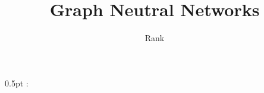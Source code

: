 \documentclass[11pt]{article}
\title{Graph Neutral Networks}
\author{Rank}
\affil{公众号：经济知识综合 \\ \email{fanxiaolong98@gmail.com}}
\numberwithin{equation}{section}
\numberwithin{figure}{section}
\begin{document}
 {\topsep}%
 {\topsep}%
 {\upshape}%
 {0.5pt}%
 {\bfseries}%
 {: }%
 { }%
 {}

\theoremstyle{mydef}

\newtheorem{myExample}{Example}[section]
\newtheorem{myRemark}{Remark}[section]
\newtheorem{mydef}{Definiton}[section]

    \maketitle
    \tableofcontents
    \newpage
    
    
    
    
    
    
    
\end{document}

